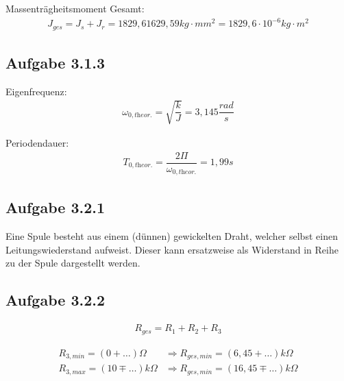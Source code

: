 \documentclass[a4paper]{scrartcl}
\begin{document}
Massenträgheitsmoment Gesamt:
\begin{align}
J_{ges} = J_{s} + J_{r} = 1829,6 1629,59 kg \cdot mm^2 = 1829,6 \cdot 10^{-6} kg \cdot m^2
\end{align}
	
\subsection{Aufgabe 3.1.3}

Eigenfrequenz:
\begin{align}
\omega_{0,\textit{theor.}} = \sqrt{\dfrac{k}{J}} = 3,145 \dfrac{rad}{s}
\end{align}

Periodendauer:
\begin{align}
T_{0,\textit{theor.}} = \dfrac{2\Pi}{\omega_{0,\textit{theor.}}} = 1,99s
\end{align}

\subsection{Aufgabe 3.2.1}

Eine Spule besteht aus einem (dünnen) gewickelten Draht, welcher selbst einen Leitungswiederstand aufweist.
Dieser kann ersatzweise als Widerstand in Reihe zu der Spule dargestellt werden.

\subsection{Aufgabe 3.2.2}

\begin{align}
R_{ges} = R_1 + R_2 + R_3
\end{align}

\begin{align*}
R_{3,min} = (0+\dots)\Omega &\Rightarrow R_{ges,min} = (6,45+\dots)k\Omega \\
R_{3,max} = (10\mp\dots)k\Omega &\Rightarrow R_{ges,min} = (16,45\mp\dots)k\Omega
\end{align*}
\end{document}
